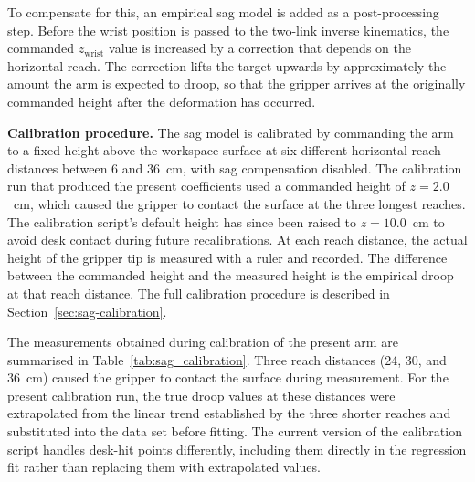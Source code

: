 To compensate for this, an empirical sag model is added as a 
post-processing step. Before the wrist position is passed to the 
two-link inverse kinematics, the commanded $z_{\mathrm{wrist}}$ 
value is increased by a correction that depends on the horizontal 
reach. The correction lifts the target upwards by approximately 
the amount the arm is expected to droop, so that the gripper 
arrives at the originally commanded height after the deformation 
has occurred.

\textbf{Calibration procedure.} The sag model is calibrated by
commanding the arm to a fixed height above the workspace surface
at six different horizontal reach distances between 6 and
36~cm, with sag compensation disabled. The calibration run
that produced the present coefficients used a commanded height
of $z = 2.0$~cm, which caused the gripper to contact the
surface at the three longest reaches. The calibration script's
default height has since been raised to $z = 10.0$~cm to avoid
desk contact during future recalibrations. At each
reach distance, the actual height of the gripper tip is measured 
with a ruler and recorded. The difference between the commanded 
height and the measured height is the empirical droop at that 
reach distance. The full calibration procedure is described in 
Section~\ref{sec:sag-calibration}.

The measurements obtained during calibration of the present arm
are summarised in Table~\ref{tab:sag_calibration}. Three reach distances (24, 30, and
36~cm) caused the gripper to contact the surface during
measurement. For the present calibration run, the true droop
values at these distances were extrapolated from the linear
trend established by the three shorter reaches and substituted
into the data set before fitting. The current version of the
calibration script handles desk-hit points differently,
including them directly in the regression fit rather than
replacing them with extrapolated values.

